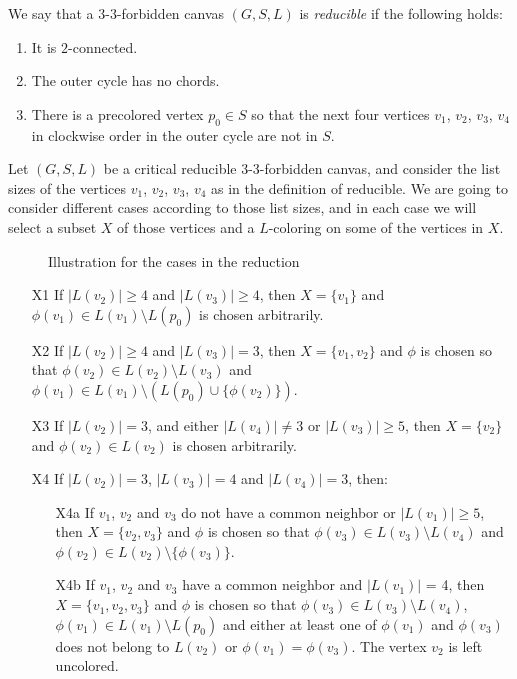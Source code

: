 \begin{definition}
We say that a 3-3-forbidden canvas $(G, S, L)$ is \emph{reducible} if the following holds:
\begin{enumerate}
	\item It is $2$-connected.
	\item The outer cycle has no chords.
	\item There is a precolored vertex $p_0 \in S$ so that the next four vertices 
	$v_1$, $v_2$, $v_3$, $v_4$ in clockwise order in the outer cycle are not in $S$. 
\end{enumerate}
\end{definition}

Let $(G, S, L)$ be a critical reducible 3-3-forbidden canvas, and consider the list sizes of
the vertices $v_1$, $v_2$, $v_3$, $v_4$ as in the definition of reducible. We are going to consider
different cases according to those list sizes, and in each case we will select a subset $X$ of those
vertices and a $L$-coloring on some of the vertices in $X$. 

\begin{figure}
\label{fig:reductioncases}
\centering
{}
\caption{Illustration for the cases in the reduction}
\end{figure}

\begin{itemize}
	\item [X1] If $|L(v_2)| \geq 4$ and $|L(v_3)| \geq 4$, then $X = \{v_1\}$ and 
	$\phi(v_1) \in L(v_1) \setminus L(p_0)$ is chosen arbitrarily.
	\item [X2] If $|L(v_2)| \geq 4$ and $|L(v_3)| = 3$, then $X = \{v_1, v_2\}$ and $\phi$ is 
	chosen so that $\phi(v_2) \in L(v_2) \setminus L(v_3)$ and 
	$\phi(v_1) \in L(v_1) \setminus (L(p_0) \cup \{\phi(v_2)\})$.
	\item [X3] If $|L(v_2)| = 3$, and either $|L(v_4)| \neq 3$ or $|L(v_3)| \geq 5$, then 
	$X = \{v_2\}$ and $\phi(v_2) \in L(v_2)$ is chosen arbitrarily. 
	\item [X4] If $|L(v_2)| = 3$, $|L(v_3)| = 4$ and $|L(v_4)| = 3$, then:
	\begin{itemize}
		\item [X4a] If $v_1$, $v_2$ and $v_3$ do not have a common neighbor or 
		$|L(v_1)| \geq 5$, then $X = \{v_2, v_3\}$ and $\phi$ is chosen so that
		$\phi(v_3) \in L(v_3) \setminus L(v_4)$ and 
		$\phi(v_2) \in L(v_2) \setminus \{\phi(v_3)\}$.
		\item [X4b] If $v_1$, $v_2$ and $v_3$ have a common neighbor and $|L(v_1)|$ = 4, then
		$X = \{v_1, v_2, v_3\}$ and $\phi$ is chosen so that 
		$\phi(v_3) \in L(v_3) \setminus L(v_4)$, 
		$\phi(v_1) \in L(v_1) \setminus L(p_0)$ 
		and either at least one of $\phi(v_1)$ and $\phi(v_3)$
		does not belong to $L(v_2)$ or $\phi(v_1) = \phi(v_3)$. 
		The vertex $v_2$ is left uncolored.
	\end{itemize}
\end{itemize}

